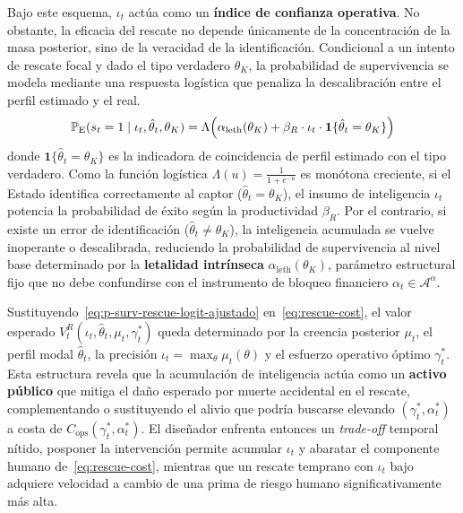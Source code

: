 \documentclass[12pt]{article}
\theoremstyle{definition}
\theoremstyle{remark}
\newcommand{\ProbE}{\mathbb{P}_{\mathrm{E}}}
\newcommand{\1}{\mathbf{1}}
\begin{document}
Bajo este esquema, $\iota_t$ actúa como un \textbf{índice de confianza operativa}. No obstante, la eficacia del rescate no depende únicamente de la concentración de la masa posterior, sino de la veracidad de la identificación. Condicional a un intento de rescate focal y dado el tipo verdadero $\theta_K$, la probabilidad de supervivencia se modela mediante una respuesta logística que penaliza la descalibración entre el perfil estimado y el real.
\begin{equation}
\label{eq:p-surv-rescue-logit-ajustado}
\ProbE(s_t=1\mid\iota_t, \hat{\theta}_t, \theta_K) = \Lambda\Bigl(\alpha_{\mathrm{leth}}(\theta_K) + \beta_{R} \cdot \iota_t \cdot \mathbf{1}\{\hat{\theta}_t = \theta_K\} \Bigr)
\end{equation}
donde $\mathbf{1}\{\hat{\theta}_t=\theta_K\}$ es la indicadora de coincidencia de perfil estimado con el tipo verdadero. Como la función logística $\Lambda(u)=\frac{1}{1+e^{-u}}$ es monótona creciente, si el Estado identifica correctamente al captor ($\hat{\theta}_t = \theta_K$), el insumo de inteligencia $\iota_t$ potencia la probabilidad de éxito según la productividad $\beta_R$. Por el contrario, si existe un error de identificación ($\hat{\theta}_t \neq \theta_K$), la inteligencia acumulada se vuelve inoperante o descalibrada, reduciendo la probabilidad de supervivencia al nivel base determinado por la \textbf{letalidad intrínseca} $\alpha_{\mathrm{leth}}(\theta_K)$, parámetro estructural fijo que no debe confundirse con el instrumento de bloqueo financiero $\alpha_t\in\mathcal{A}^{\alpha}$.



Sustituyendo~\eqref{eq:p-surv-rescue-logit-ajustado} en~\eqref{eq:rescue-cost}, el valor esperado $V_t^R(\iota_t,\hat{\theta}_t,\mu_t,\gamma_t^\ast)$ queda determinado por la creencia posterior $\mu_t$, el perfil modal $\hat{\theta}_t$, la precisión $\iota_t=\max_\theta\mu_t(\theta)$ y el esfuerzo operativo óptimo $\gamma_t^\ast$. Esta estructura revela que la acumulación de inteligencia actúa como un \textbf{activo público} que mitiga el daño esperado por muerte accidental en el rescate, complementando o sustituyendo el alivio que podría buscarse elevando $(\gamma_t^\ast,\alpha_t^\ast)$ a costa de $C_{\mathrm{ops}}(\gamma_t^\ast,\alpha_t^\ast)$. El diseñador enfrenta entonces un \textit{trade-off} temporal nítido, posponer la intervención permite acumular $\iota_t$ y abaratar el componente humano de~\eqref{eq:rescue-cost}, mientras que un rescate temprano con $\iota_t$ bajo adquiere velocidad a cambio de una prima de riesgo humano significativamente más alta.
\end{document}
